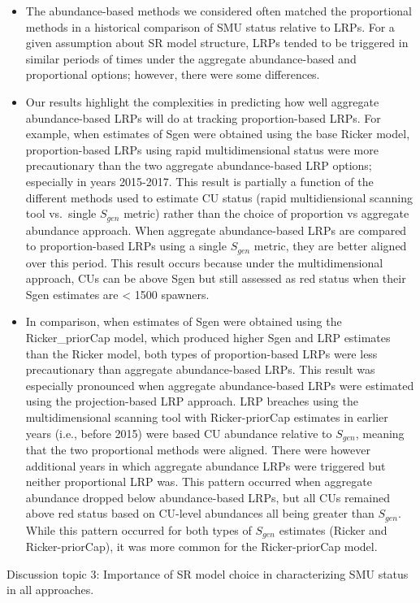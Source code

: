 \documentclass[11pt]{book}
\begin{document}
\begin{itemize}
\item
  The abundance-based methods we considered often matched the proportional methods in a historical comparison of SMU status relative to LRPs. For a given assumption about SR model structure, LRPs tended to be triggered in similar periods of times under the aggregate abundance-based and proportional options; however, there were some differences.
\item
  Our results highlight the complexities in predicting how well aggregate abundance-based LRPs will do at tracking proportion-based LRPs. For example, when estimates of Sgen were obtained using the base Ricker model, proportion-based LRPs using rapid multidimensional status were more precautionary than the two aggregate abundance-based LRP options; especially in years 2015-2017. This result is partially a function of the different methods used to estimate CU status (rapid multidiensional scanning tool vs.~single \(S_{gen}\) metric) rather than the choice of proportion vs aggregate abundance approach. When aggregate abundance-based LRPs are compared to proportion-based LRPs using a single \(S_{gen}\) metric, they are better aligned over this period. This result occurs because under the multidimensional approach, CUs can be above Sgen but still assessed as red status when their Sgen estimates are \textless{} 1500 spawners.
\item
  In comparison, when estimates of Sgen were obtained using the Ricker\_priorCap model, which produced higher Sgen and LRP estimates than the Ricker model, both types of proportion-based LRPs were less precautionary than aggregate abundance-based LRPs. This result was especially pronounced when aggregate abundance-based LRPs were estimated using the projection-based LRP approach. LRP breaches using the multidimensional scanning tool with Ricker-priorCap estimates in earlier years (i.e., before 2015) were based CU abundance relative to \(S_{gen}\), meaning that the two proportional methods were aligned. There were however additional years in which aggregate abundance LRPs were triggered but neither proportional LRP was. This pattern occurred when aggregate abundance dropped below abundance-based LRPs, but all CUs remained above red status based on CU-level abundances all being greater than \(S_{gen}\). While this pattern occurred for both types of \(S_{gen}\) estimates (Ricker and Ricker-priorCap), it was more common for the Ricker-priorCap model.
\end{itemize}
Discussion topic 3: Importance of SR model choice in characterizing SMU status in all approaches.
\end{document}
